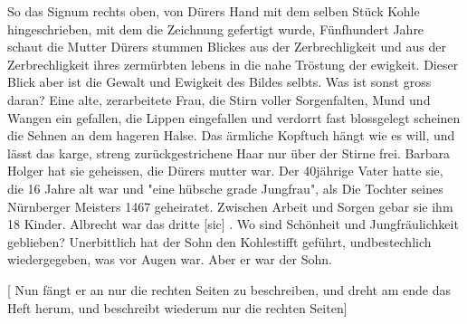 \def\day{28.8.1942}
\mktitle

So das Signum rechts oben, von D\"{u}rers Hand mit dem selben St\"{u}ck Kohle hingeschrieben, mit dem die Zeichnung gefertigt wurde, F\"{u}nfhundert Jahre schaut die Mutter D\"{u}rers stummen Blickes aus der Zerbrechligkeit und aus der Zerbrechligkeit ihres zerm\"{u}rbten lebens in die nahe Tr\"{o}stung der ewigkeit.
Dieser Blick aber ist die Gewalt und Ewigkeit des Bildes selbts.
Was ist sonst gross daran?
Eine alte, zerarbeitete Frau, die Stirn voller Sorgenfalten, Mund und Wangen ein gefallen, die Lippen eingefallen und verdorrt fast blossgelegt scheinen die Sehnen an dem hageren Halse.
Das \"{a}rmliche Kopftuch h\"{a}ngt wie es will, und l\"{a}sst das karge, streng zur\"{u}ckgestrichene Haar nur \"{u}ber der Stirne frei.
Barbara Holger hat sie geheissen, die D\"{u}rers mutter war.
Der 40j\"{a}hrige Vater hatte sie, die 16 Jahre alt war und "eine h\"{u}bsche grade Jungfrau", als Die Tochter seines N\"{u}rnberger Meisters 1467 geheiratet.
Zwischen Arbeit und Sorgen gebar sie ihm 18 Kinder.
Albrecht war das dritte{\color{red} [sic] }.
Wo sind Sch\"{o}nheit und Jungfr\"{a}ulichkeit geblieben?
Unerbittlich hat der Sohn den Kohlestifft gef\"{u}hrt, undbestechlich wiedergegeben, was vor Augen war.
Aber er war der Sohn.

\vfill

{\color{red} [ Nun f\"{a}ngt er an nur die rechten Seiten zu beschreiben, und dreht am ende das Heft herum, und beschreibt wiederum nur die rechten Seiten] }

\clearpage
